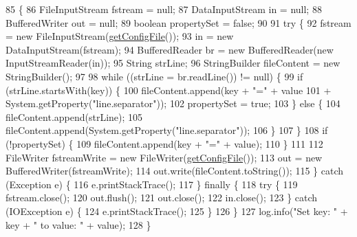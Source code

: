 \begin{DoxyCode}
85                                                              \{
86         FileInputStream fstream = null;
87         DataInputStream in = null;
88         BufferedWriter out = null;
89         \textcolor{keywordtype}{boolean} propertySet = \textcolor{keyword}{false};
90 
91         \textcolor{keywordflow}{try} \{
92             fstream = \textcolor{keyword}{new} FileInputStream(\hyperlink{classit_1_1isislab_1_1masonassisteddocumentation_1_1mason_1_1control_1_1_config_file_af791ff01652e95f6385641909b805e20}{getConfigFile}());
93             in = \textcolor{keyword}{new} DataInputStream(fstream);
94             BufferedReader br = \textcolor{keyword}{new} BufferedReader(\textcolor{keyword}{new} InputStreamReader(in));
95             String strLine;
96             StringBuilder fileContent = \textcolor{keyword}{new} StringBuilder();
97 
98             \textcolor{keywordflow}{while} ((strLine = br.readLine()) != null) \{
99                 \textcolor{keywordflow}{if} (strLine.startsWith(key)) \{
100                     fileContent.append(key + \textcolor{stringliteral}{"="} + value
101                             + System.getProperty(\textcolor{stringliteral}{"line.separator"}));
102                     propertySet = \textcolor{keyword}{true};
103                 \} \textcolor{keywordflow}{else} \{
104                     fileContent.append(strLine);
105                     fileContent.append(System.getProperty(\textcolor{stringliteral}{"line.separator"}));
106                 \}
107             \}
108             \textcolor{keywordflow}{if} (!propertySet) \{
109                 fileContent.append(key + \textcolor{stringliteral}{"="} + value);
110             \}
111 
112             FileWriter fstreamWrite = \textcolor{keyword}{new} FileWriter(\hyperlink{classit_1_1isislab_1_1masonassisteddocumentation_1_1mason_1_1control_1_1_config_file_af791ff01652e95f6385641909b805e20}{getConfigFile}());
113             out = \textcolor{keyword}{new} BufferedWriter(fstreamWrite);
114             out.write(fileContent.toString());
115         \} \textcolor{keywordflow}{catch} (Exception e) \{
116             e.printStackTrace();
117         \} \textcolor{keywordflow}{finally} \{
118             \textcolor{keywordflow}{try} \{
119                 fstream.close();
120                 out.flush();
121                 out.close();
122                 in.close();
123             \} \textcolor{keywordflow}{catch} (IOException e) \{
124                 e.printStackTrace();
125             \}
126         \}
127         log.info(\textcolor{stringliteral}{"Set key: "} + key + \textcolor{stringliteral}{" to value: "} + value);
128     \}
\end{DoxyCode}


